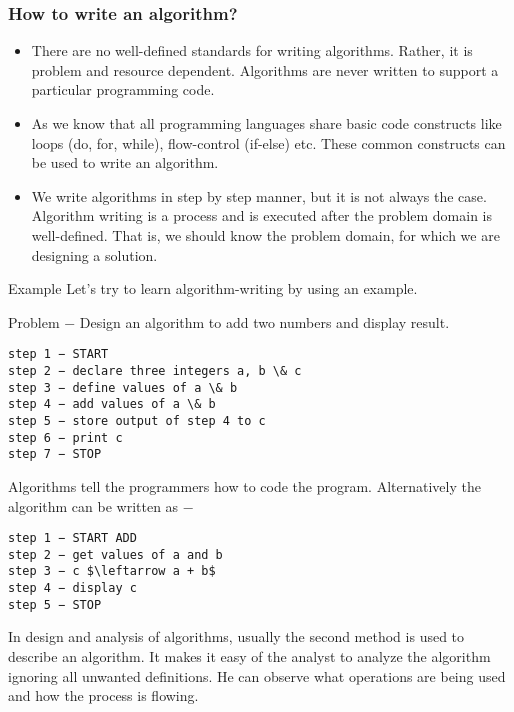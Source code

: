 \documentclass{beamer}
\begin{document}
\begin{frame}
\frametitle{How to write an algorithm?}
\begin{itemize}
	\item There are no well-defined standards for writing algorithms. Rather, it is problem and resource dependent. Algorithms are never written to support a particular programming code.
	
\item As we know that all programming languages share basic code constructs like loops (do, for, while), flow-control (if-else) etc. These common constructs can be used to write an algorithm.
	
\item We write algorithms in step by step manner, but it is not always the case. Algorithm writing is a process and is executed after the problem domain is well-defined. That is, we should know the problem domain, for which we are designing a solution.
\end{itemize}

\end{frame}
\begin{frame}[fragile]
Example
Let's try to learn algorithm-writing by using an example.

Problem − Design an algorithm to add two numbers and display result.
\begin{verbatim}
step 1 − START
step 2 − declare three integers a, b \& c
step 3 − define values of a \& b
step 4 − add values of a \& b
step 5 − store output of step 4 to c
step 6 − print c
step 7 − STOP
\end{verbatim}

\end{frame}
\begin{frame}[fragile]
Algorithms tell the programmers how to code the program. Alternatively the algorithm can be written as −
\begin{verbatim}
step 1 − START ADD
step 2 − get values of a and b
step 3 − c $\leftarrow a + b$
step 4 − display c
step 5 − STOP
\end{verbatim}
\end{frame}
\begin{frame}
In design and analysis of algorithms, usually the second method is used to describe an algorithm. It makes it easy of the analyst to analyze the algorithm ignoring all unwanted definitions. He can observe what operations are being used and how the process is flowing.
\end{frame}
\end{document}

